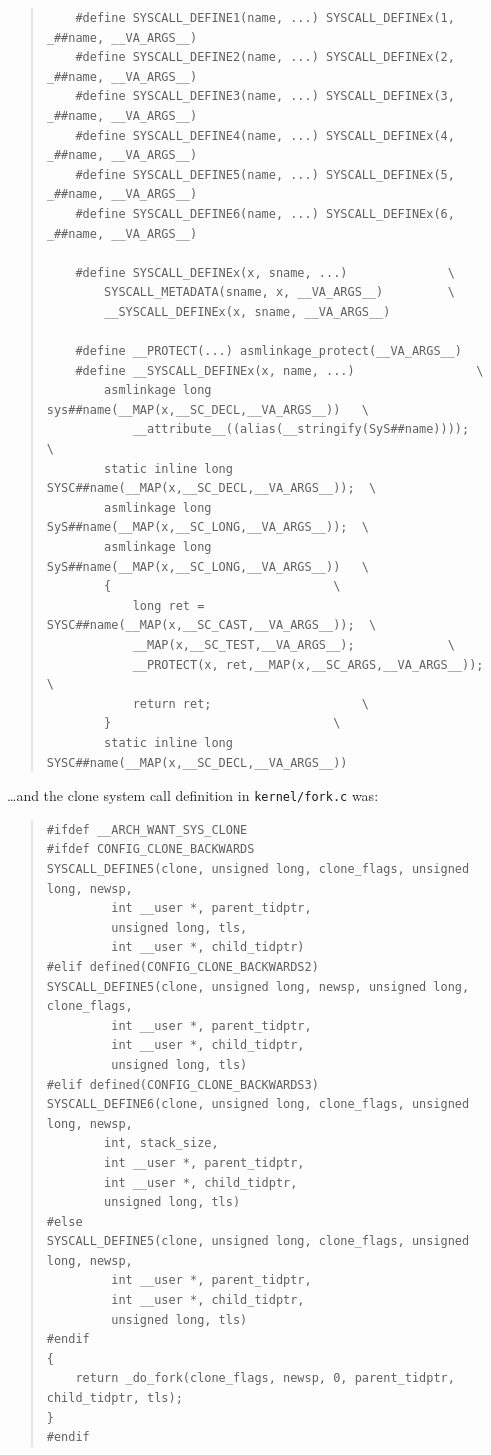 \documentclass{article}
\begin{document}
\begin{quote}
\begin{verbatim}
	#define SYSCALL_DEFINE1(name, ...) SYSCALL_DEFINEx(1, _##name, __VA_ARGS__)
	#define SYSCALL_DEFINE2(name, ...) SYSCALL_DEFINEx(2, _##name, __VA_ARGS__)
	#define SYSCALL_DEFINE3(name, ...) SYSCALL_DEFINEx(3, _##name, __VA_ARGS__)
	#define SYSCALL_DEFINE4(name, ...) SYSCALL_DEFINEx(4, _##name, __VA_ARGS__)
	#define SYSCALL_DEFINE5(name, ...) SYSCALL_DEFINEx(5, _##name, __VA_ARGS__)
	#define SYSCALL_DEFINE6(name, ...) SYSCALL_DEFINEx(6, _##name, __VA_ARGS__)

	#define SYSCALL_DEFINEx(x, sname, ...)				\
		SYSCALL_METADATA(sname, x, __VA_ARGS__)			\
		__SYSCALL_DEFINEx(x, sname, __VA_ARGS__)

	#define __PROTECT(...) asmlinkage_protect(__VA_ARGS__)
	#define __SYSCALL_DEFINEx(x, name, ...)					\
		asmlinkage long sys##name(__MAP(x,__SC_DECL,__VA_ARGS__))	\
			__attribute__((alias(__stringify(SyS##name))));		\
		static inline long SYSC##name(__MAP(x,__SC_DECL,__VA_ARGS__));	\
		asmlinkage long SyS##name(__MAP(x,__SC_LONG,__VA_ARGS__));	\
		asmlinkage long SyS##name(__MAP(x,__SC_LONG,__VA_ARGS__))	\
		{								\
			long ret = SYSC##name(__MAP(x,__SC_CAST,__VA_ARGS__));	\
			__MAP(x,__SC_TEST,__VA_ARGS__);				\
			__PROTECT(x, ret,__MAP(x,__SC_ARGS,__VA_ARGS__));	\
			return ret;						\
		}								\
		static inline long SYSC##name(__MAP(x,__SC_DECL,__VA_ARGS__))
\end{verbatim}
\end{quote}

\ldots and the clone system call definition in \texttt{kernel/fork.c} was:

\begin{quote}
\begin{verbatim}
#ifdef __ARCH_WANT_SYS_CLONE
#ifdef CONFIG_CLONE_BACKWARDS
SYSCALL_DEFINE5(clone, unsigned long, clone_flags, unsigned long, newsp,
		 int __user *, parent_tidptr,
		 unsigned long, tls,
		 int __user *, child_tidptr)
#elif defined(CONFIG_CLONE_BACKWARDS2)
SYSCALL_DEFINE5(clone, unsigned long, newsp, unsigned long, clone_flags,
		 int __user *, parent_tidptr,
		 int __user *, child_tidptr,
		 unsigned long, tls)
#elif defined(CONFIG_CLONE_BACKWARDS3)
SYSCALL_DEFINE6(clone, unsigned long, clone_flags, unsigned long, newsp,
		int, stack_size,
		int __user *, parent_tidptr,
		int __user *, child_tidptr,
		unsigned long, tls)
#else
SYSCALL_DEFINE5(clone, unsigned long, clone_flags, unsigned long, newsp,
		 int __user *, parent_tidptr,
		 int __user *, child_tidptr,
		 unsigned long, tls)
#endif
{
	return _do_fork(clone_flags, newsp, 0, parent_tidptr, child_tidptr, tls);
}
#endif
\end{verbatim}
\end{quote}
\end{document}
